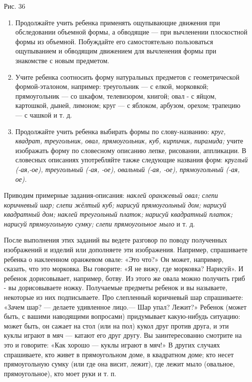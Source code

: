 \documentclass[a5paper]{book}
\renewcommand{\emph}[1]{\textit{#1}}
\begin{document}
Рис. 36


\begin{enumerate}
\def\labelenumi{\arabic{enumi}.}
\setcounter{enumi}{4}
\item
  
  Продолжайте учить ребенка применять ощупывающие движения при
  обследовании объемной формы, а обводящие --- при вычленении
  плоскостной формы из объемной. Побуждайте его самостоятельно
  пользоваться ощупыванием и обводящим движением для вычленения формы
  при знакомстве с новым предметом.
  
\item
  
  Учите ребенка соотносить форму натуральных предметов с геометрической
  формой-эталоном, например: треугольник --- с елкой, морковкой;
  прямоугольник --- со шкафом, телевизором, книгой; овал - с яйцом,
  картошкой, дыней, лимоном; круг --- с яблоком, арбузом, орехом;
  трапецию --- с чашкой и т. д.
  
\item
  
  Продолжайте учить ребенка выбирать формы по слову-названию:
  \emph{круг, квадрат, треугольник, овал, прямоугольник, куб, кирпичик,
  пирамида;} учите изображать форму по словесному описанию лепке,
  рисовании, аппликации. В словесных описаниях употребляйте также
  следующие названия форм: \emph{круглый (-ая,-ое), треугольный (-ая,
  -ое), овальный (-ая, -ое), прямоугольный (-ая, ое).}
  
\end{enumerate}


Приводим примерные задания-описания: \emph{наклей оранжевый овал; слепи
коричневый шар; слепи жёлтый куб; нарисуй прямоугольный дом; нарисуй
квадратный дом; наклей треугольный платок; нарисуй квадратный платок;
нарисуй прямоугольную сумку; слепи прямоугольное мыло} и т. д.

После выполнения этих заданий вы ведете разговор по поводу полученных
изображений и изделий или дополняете эти изображения. Например,
спрашиваете ребенка о наклеенном оранжевом овале: «Это что?» Он может,
например, сказать, что это морковка. Вы говорите: «Я не вижу, где
морковка? Нарисуй». И ребенок дорисовывает, например, ботву. Из этого же
овала можно получить гриб - вы дорисовываете ножку. Получаемые предметы
ребенок и вы называете, некоторые из них подписываете. Про слепленный
коричневый шар спрашиваете: «Зачем шар? --- делаете удивленное лицо.---
Шар упал? Лежит?» Ребенок (может быть, с вашими наводящими вопросами)
придумывает какую-нибудь ситуацию: может быть, он сажает на стол (или на
пол) кукол друг против друга, и эти куклы играют в мяч --- катают его
друг другу. Вы заинтересованно смотрите на это и говорите: «Как хорошо
--- куклы играют в мяч!» В других случаях спрашиваете, кто живет в
прямоугольном доме, в квадратном доме; кто несет прямоугольную сумку
(или где она висит, лежит), где лежит мыло (овальное, прямоугольное),
кто моет руки и т. п.
\end{document}
